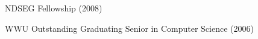 \documentclass[margin,line]{res}
\begin{document}
\begin{resume}
NDSEG Fellowship (2008)
\vspace*{-2.5mm}

WWU Outstanding Graduating Senior in Computer Science (2006)







\begin{comment}
\section{\sc Research Projects}

{\bf Information Extraction in Social Media}
Off-the shelf tools such as Part of Speech Taggers and Named Entity Recognizers perform poorly when applied to Social Media text due to its noisy and unique style. To address this I have been working towards building a set of Twitter-specific text processing tools [EMNLP 2011a].  Users of Social Media sites frequently discuss events which will occur in the future. By annotating Named Entities and resolving temporal expressions (for example ``next Friday''), we are able to automatically extract a calendar of popular events occurring in the near future from Twitter [KDD 2012].

{\bf Conversational Modeling in Social Media}
I have worked on unsupervised modeling of dialogue acts in Twitter [NAACL 2010]. By remaining agnostic about the set of classes, we are able to learn a model which provides insight into the nature of communication in a new medium.  I have investigated the feasibility of automatically replying to status messages by adapting techniques from Statistical Machine Translation [EMNLP 2011b], using millions of naturally occurring Twitter conversations as parallel text. Although there are many differences between conversation and translation, with a few conversation-specific adaptations we are able to build response models which often generate appropriate replies to Twitter status posts. This work has several possible applications, including conversationally aware predictive text entry.


\end{comment}
\end{resume}
\end{document}
